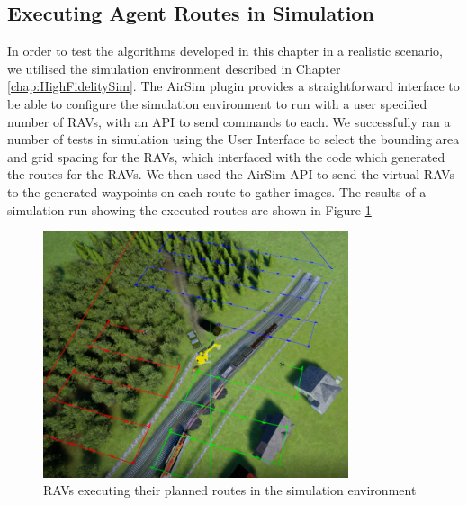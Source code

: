 \subsection{Executing Agent Routes in Simulation}\label{subsec:routesInSimulation}
In order to test the algorithms developed in this chapter in a realistic scenario, we utilised the simulation environment described in Chapter \ref{chap:HighFidelitySim}. The AirSim plugin \cite{Shah2017AirSim:Vehicles} provides a straightforward interface to be able to configure the simulation environment to run with a user specified number of RAVs, with an API to send commands to each. We successfully ran a number of tests in simulation using the User Interface to select the bounding area and grid spacing for the RAVs, which interfaced with the code which generated the routes for the RAVs. We then used the AirSim API to send the virtual RAVs to the generated waypoints on each route to gather images. The results of a simulation run showing the executed routes are shown in Figure \ref{fig:VirtualPlannedRoutes}


\begin{figure}[h]
    \centering
    \includegraphics[width=0.8\textwidth]{Chapters/SimulationEnv/Figs/DebuggingLines/RoutesWithRAVsVisible.png}
    \caption{RAVs executing their planned routes in the simulation environment}
    \label{fig:VirtualPlannedRoutes}
\end{figure}